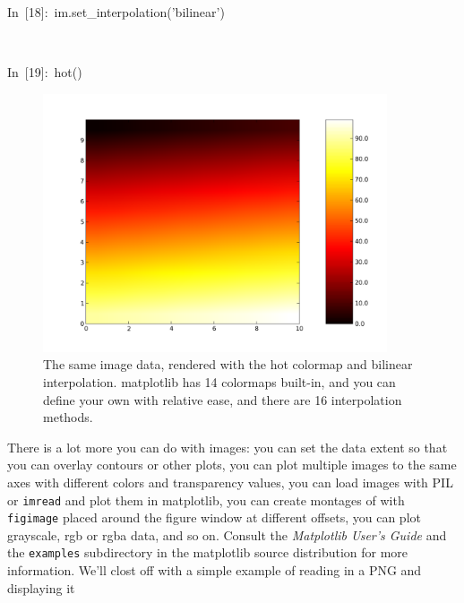 \begin{lyxcode}
In~{[}18]:~im.set\_interpolation('bilinear')

~

In~{[}19]:~hot()

%
\begin{figure}
\begin{centering}
\includegraphics[width=4in]{fig/mpl_image_hot}
\par\end{centering}

\caption{\label{fig:mpl_imshow_hot}The same image data, rendered with the
hot colormap and bilinear interpolation. matplotlib has 14 colormaps
built-in, and you can define your own with relative ease, and there
are 16 interpolation methods.}

\end{figure}

\end{lyxcode}
There is a lot more you can do with images: you can set the data extent
so that you can overlay contours or other plots, you can plot multiple
images to the same axes with different colors and transparency values,
you can load images with PIL or \texttt{imread} and plot them in matplotlib,
you can create montages of with \texttt{figimage} placed around the
figure window at different offsets, you can plot grayscale, rgb or
rgba data, and so on.  Consult the \textit{Matplotlib User's Guide}
and the \texttt{examples} subdirectory in the matplotlib source distribution
for more information. We'll clost off with a simple example of reading
in a PNG and displaying it

